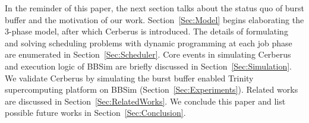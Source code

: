 In the reminder of this paper,
the next section talks about the status quo of burst buffer and
the motivation of our work.
Section~\ref{Sec:Model} begins elaborating the 3-phase model,
after which Cerberus is introduced.
The details of formulating and solving scheduling problems with
dynamic programming at each job phase are enumerated in Section~\ref{Sec:Scheduler}.
Core events in simulating Cerberus and execution logic of BBSim are
briefly discussed in Section~\ref{Sec:Simulation}.
We validate Cerberus by simulating the burst buffer enabled
Trinity supercomputing platform on BBSim (Section~\ref{Sec:Experiments}).
Related works are discussed in Section~\ref{Sec:RelatedWorks}.
We conclude this paper and list possible future works in Section~\ref{Sec:Conclusion}.


